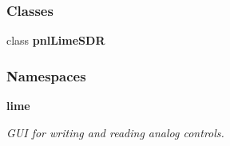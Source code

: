 \subsubsection*{Classes}
\begin{DoxyCompactItemize}
\item 
class {\bf pnl\+Lime\+S\+DR}
\end{DoxyCompactItemize}
\subsubsection*{Namespaces}
\begin{DoxyCompactItemize}
\item 
 {\bf lime}
\begin{DoxyCompactList}\small\item\em G\+UI for writing and reading analog controls. \end{DoxyCompactList}\end{DoxyCompactItemize}
